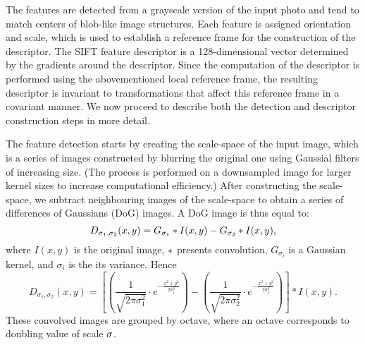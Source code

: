 The features are detected from a grayscale version of the input photo and tend to match centers of blob-like image structures. 
Each feature is assigned orientation and scale, which is used to establish a reference frame for the construction of the descriptor. 
The SIFT feature descriptor is a 128-dimensional vector determined by the gradients around the descriptor.
Since the computation of the descriptor is performed using the abovementioned local reference frame, the resulting descriptor is invariant to transformations that affect this reference frame in a covariant manner. %
We now proceed to describe both the detection and descriptor construction steps in more detail. 

The feature detection starts by creating the scale-space of the input image, 
which is a series of images constructed by blurring the original one using Gaussial filters of increasing size. 
(The process is performed on a downsampled image for larger kernel sizes to increase computational efficiency.)
After constructing the scale-space, we subtract neighbouring images of the scale-space to obtain a series of differences of Gaussians (DoG) images. 
A DoG image is thus equal to: 
\[ D_{\sigma_1, \sigma_2}(x, y) = G_{\sigma_1} * I(x, y) - G_{\sigma_2} * I(x, y), \]
where $I(x, y)$ is the original image, $*$ presents convolution, $G_{\sigma_i}$ is a Gaussian kernel, and $\sigma_i$ is the its variance. 
Hence
\[
D_{\sigma_1, \sigma_2}(x, y) = 
\left[
\left( \frac{1}{\sqrt{2\pi \sigma _1^{2}}} \cdot e^{-\frac{x^{2}+y^{2}}{2\sigma_1^{2}} } \right) -
\left( \frac{1}{\sqrt{2\pi \sigma _2^{2}}} \cdot e^{-\frac{x^{2}+y^{2}}{2\sigma_2^{2}} } \right )
 \right ] * I(x, y).
\]
 These convolved images are grouped by octave, where an octave corresponds to doubling value of scale $\mathbf{\sigma}$.


